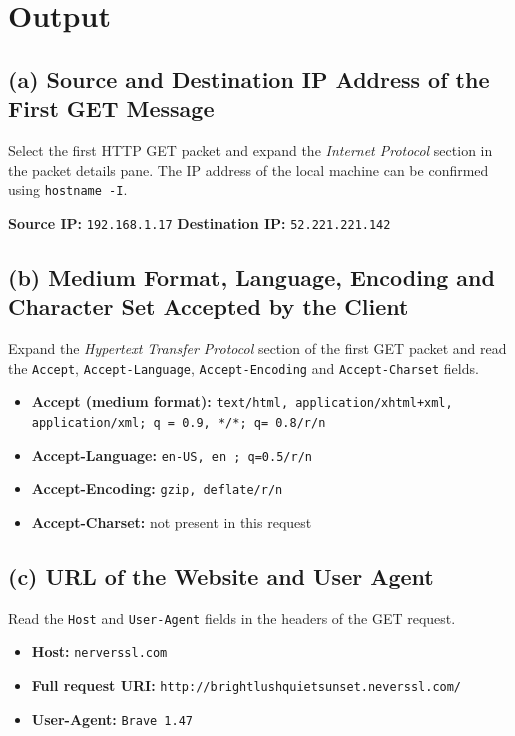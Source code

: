 \documentclass[12pt, a4paper]{report}
\begin{document}
\section*{Output}

\subsection*{(a) Source and Destination IP Address of the First GET Message}
Select the first HTTP GET packet and expand the \textit{Internet Protocol} section in the packet details pane. The IP address of the local machine can be confirmed using \texttt{hostname -I}.

\textbf{Source IP:} \texttt{192.168.1.17} \hfill \textbf{Destination IP:} \texttt{52.221.221.142}

\subsection*{(b) Medium Format, Language, Encoding and Character Set Accepted by the Client}
Expand the \textit{Hypertext Transfer Protocol} section of the first GET packet and read the \texttt{Accept}, \texttt{Accept-Language}, \texttt{Accept-Encoding} and \texttt{Accept-Charset} fields.

\begin{itemize}
	\item \textbf{Accept (medium format):} \texttt{text/html, application/xhtml+xml, application/xml; q = 0.9, */*; q= 0.8/r/n}
	\item \textbf{Accept-Language:} \texttt{en-US, en ; q=0.5/r/n}
	\item \textbf{Accept-Encoding:} \texttt{gzip, deflate/r/n}
	\item \textbf{Accept-Charset:} not present in this request
\end{itemize}

\subsection*{(c) URL of the Website and User Agent}
Read the \texttt{Host} and \texttt{User-Agent} fields in the headers of the GET request.

\begin{itemize}
	\item \textbf{Host:} \texttt{nerverssl.com}
	\item \textbf{Full request URI:} \texttt{http://brightlushquietsunset.neverssl.com/}
	\item \textbf{User-Agent:} \texttt{Brave 1.47}
\end{itemize}
\end{document}

